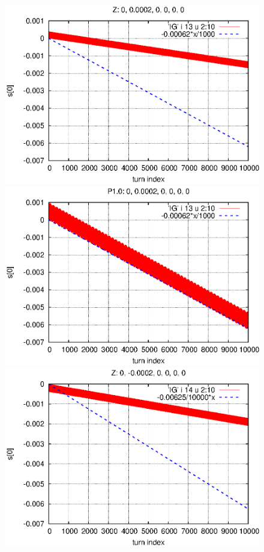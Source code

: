 \documentclass[]{article}
\begin{document}
%
\begin{figure}[h]
\centering
\includegraphics[scale=0.6]{eps/SpinEvolve13.Z.eps}
\includegraphics[scale=0.6]{eps/SpinEvolve13.P1.0.eps}
\includegraphics[scale=0.6]{eps/SpinEvolve14.Z.eps}

\end{figure}
\end{document}

